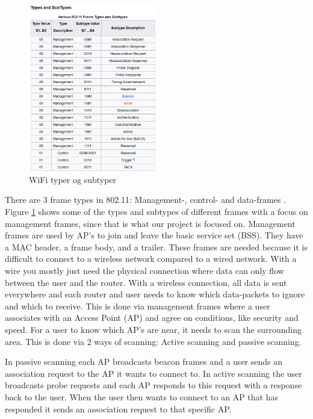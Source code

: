 \begin{figure}[!htbp]
    \centering
    \includegraphics[width=0.5\textwidth]{Latex-Files/Billeder/WiFi_Types.png}
    \caption{WiFi typer og subtyper}
    \label{WiFi Types}
\end{figure}

There are 3 frame types in 802.11: Management-, control- and data-frames \cite{Amit802.11frames, DefinitiveGast}. Figure \ref{WiFi Types} shows some of the types and subtypes of different frames with a focus on management frames, since that is what our project is focused on.  Management frames are used by AP's to join and leave the basic service set (BSS). They have a MAC header, a frame body, and a trailer. These frames are needed because it is difficult to connect to a wireless network compared to a wired network. With a wire you mostly just need the physical connection where data can only flow between the user and the router. With a wireless connection, all data is sent everywhere and each router and user needs to know which data-packets to ignore and which to receive. This is done via management frames where a user associates with an Access Point (AP) and agree on conditions, like security and speed. For a user to know which AP's are near, it needs to scan the surrounding area. This is done via 2 ways of scanning: Active scanning and passive scanning.

In passive scanning each AP broadcasts beacon frames and a user sends an association request to the AP it wants to connect to. In active scanning the user broadcasts probe requests and each AP responds to this request with a response back to the user. When the user then wants to connect to an AP that has responded it sends an association request to that specific AP. 


